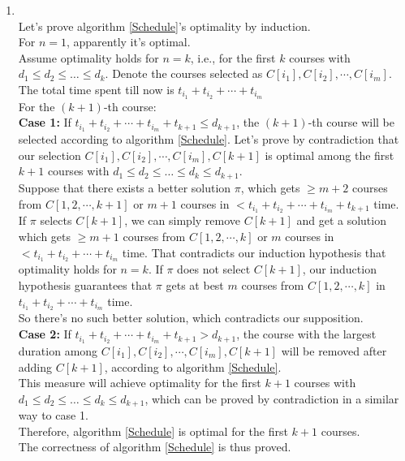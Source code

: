 \documentclass[12pt,a4paper]{article}
\makeatletter
\theoremstyle{case}
\newtheorem*{solution}{Solution}
\theoremstyle{definition}
\renewenvironment{solution}[1][Solution] {\par\pushQED{\qed}\normalfont\topsep6\p@\@plus6\p@\relax\trivlist\item[\hskip\labelsep\bfseries#1\@addpunct{.}]\ignorespaces}{\popQED\endtrivlist\@endpefalse} \makeatother
\makeatother
\begin{document}
\begin{enumerate}
\begin{solution}
\begin{minipage}[t]{0.90\textwidth}
\begin{algorithm}[H]
        	\end{algorithm}
        \end{minipage} \\
    	Let's prove algorithm \ref{Schedule}'s optimality by induction. \\
    	For $n=1$, apparently it's optimal. \\
    	Assume optimality holds for $n=k$, i.e., for the first $k$ courses with $d_1 \leq d_2 \leq \dots \leq d_k$. Denote the courses selected as $C[i_1], C[i_2], \cdots , C[i_m]$. The total time spent till now is $t_{i_1} + t_{i_2} + \cdots + t_{i_m}$\\
    	For the $(k+1)$-th course: \\
    	\textbf{Case 1:} If $t_{i_1} + t_{i_2} + \cdots + t_{i_m} + t_{k + 1} \leq d_{k+1}$, the $(k+1)$-th course will be selected according to algorithm \ref{Schedule}. Let's prove by contradiction that our selection $C[i_1], C[i_2], \cdots , C[i_m], C[k+1]$ is optimal among the first $k+1$ courses with $d_1 \leq d_2 \leq \dots \leq d_k \leq d_{k+1}$. \\
    	Suppose that there exists a better solution $\pi$, which gets $\geq m+2$ courses from $C[1, 2, \cdots , k+1]$ or $m+1$ courses in $< t_{i_1} + t_{i_2} + \cdots + t_{i_m} + t_{k+1}$ time. If $\pi$ selects $C[k+1]$, we can simply remove $C[k+1]$ and get a solution which gets $\geq m+1$ courses from $C[1, 2, \cdots , k]$ or $m$ courses in $< t_{i_1} + t_{i_2} + \cdots + t_{i_m}$ time. That contradicts our induction hypothesis that optimality holds for $n=k$. If $\pi$ does not select $C[k+1]$, our induction hypothesis guarantees that $\pi$ gets at best $m$ courses from $C[1, 2, \cdots , k]$  in $t_{i_1} + t_{i_2} + \cdots + t_{i_m}$ time. \\
    	So there's no such better solution, which contradicts our supposition. \\
    	\textbf{Case 2:} If $t_{i_1} + t_{i_2} + \cdots + t_{i_m} + t_{k + 1} > d_{k+1}$, the course with the largest duration among $C[i_1], C[i_2], \cdots , C[i_m], C[k+1]$ will be removed after adding $C[k+1]$, according to algorithm \ref{Schedule}. \\
    	This measure will achieve optimality for the first $k+1$ courses with $d_1 \leq d_2 \leq \dots \leq d_k \leq d_{k+1}$, which can be proved by contradiction in a similar way to case 1. \\
    	Therefore, algorithm \ref{Schedule} is optimal for the first $k+1$ courses. \\
    	The correctness of algorithm \ref{Schedule} is thus proved.
    \end{solution}


\end{enumerate}
\end{document}
